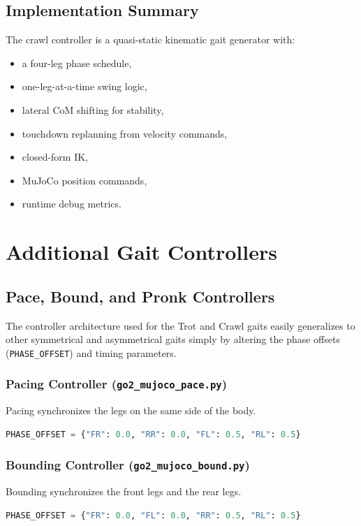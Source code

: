 \documentclass[11pt,a4paper]{report}
\begin{document}
\section{Implementation Summary}

The crawl controller is a quasi-static kinematic gait generator with:
\begin{itemize}
    \item a four-leg phase schedule,
    \item one-leg-at-a-time swing logic,
    \item lateral CoM shifting for stability,
    \item touchdown replanning from velocity commands,
    \item closed-form IK,
    \item MuJoCo position commands,
    \item runtime debug metrics.
\end{itemize}



\chapter{Additional Gait Controllers}

\section{Pace, Bound, and Pronk Controllers}
The controller architecture used for the Trot and Crawl gaits easily generalizes to other symmetrical and asymmetrical gaits simply by altering the phase offsets (\texttt{PHASE\_OFFSET}) and timing parameters.

\subsection{Pacing Controller (\texttt{go2\_mujoco\_pace.py})}
Pacing synchronizes the legs on the same side of the body.
\begin{lstlisting}[language=Python]
PHASE_OFFSET = {"FR": 0.0, "RR": 0.0, "FL": 0.5, "RL": 0.5}
\end{lstlisting}

\subsection{Bounding Controller (\texttt{go2\_mujoco\_bound.py})}
Bounding synchronizes the front legs and the rear legs.
\begin{lstlisting}[language=Python]
PHASE_OFFSET = {"FR": 0.0, "FL": 0.0, "RR": 0.5, "RL": 0.5}
\end{lstlisting}
\end{document}

